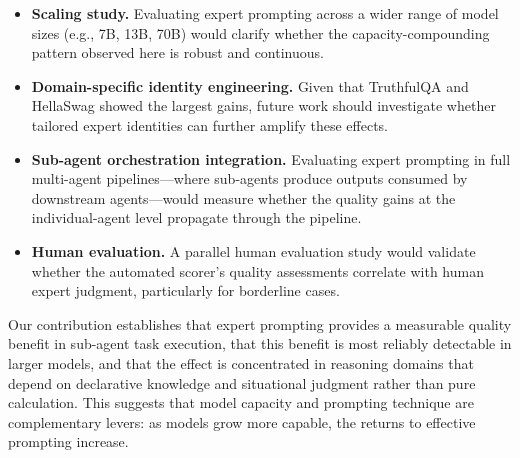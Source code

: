\documentclass[anonymous, submission, paper]{iclr2026}
\begin{document}
\begin{itemize}
  \item \textbf{Scaling study.} Evaluating expert prompting across a wider range of model sizes (e.g., 7B, 13B, 70B) would clarify whether the capacity-compounding pattern observed here is robust and continuous.

  \item \textbf{Domain-specific identity engineering.} Given that TruthfulQA and HellaSwag showed the largest gains, future work should investigate whether tailored expert identities can further amplify these effects.

  \item \textbf{Sub-agent orchestration integration.} Evaluating expert prompting in full multi-agent pipelines---where sub-agents produce outputs consumed by downstream agents---would measure whether the quality gains at the individual-agent level propagate through the pipeline.

  \item \textbf{Human evaluation.} A parallel human evaluation study would validate whether the automated scorer's quality assessments correlate with human expert judgment, particularly for borderline cases.
\end{itemize}

Our contribution establishes that expert prompting provides a measurable quality benefit in sub-agent task execution, that this benefit is most reliably detectable in larger models, and that the effect is concentrated in reasoning domains that depend on declarative knowledge and situational judgment rather than pure calculation. This suggests that model capacity and prompting technique are complementary levers: as models grow more capable, the returns to effective prompting increase.



\end{document}
